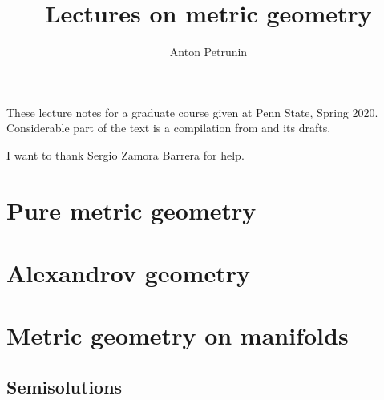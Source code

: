 \documentclass[twoside]{book}
\begin{document}
 
\title{Lectures on metric geometry}
\author{Anton Petrunin}
\date{}
\maketitle

These lecture notes for a graduate course given at Penn State, Spring 2020.
Considerable part of the text is a compilation from \cite{alexander-kapovitch-petrunin-2019, alexander-kapovitch-petrunin-2025, petrunin-yashinski, petrunin-2009, petrunin-zamorabarrera} and its drafts.

I want to thank Sergio Zamora Barrera for help.

\thispagestyle{empty}
\tableofcontents
\thispagestyle{empty}

%
\part{Pure metric geometry}




%


\part{Alexandrov geometry}






\part{Metric geometry on manifolds}


%
%
%
\appendix
\chapter{Semisolutions}








%
{\small\sloppy


\printbibliography[heading=bibintoc]
\fussy
}
\end{document}

